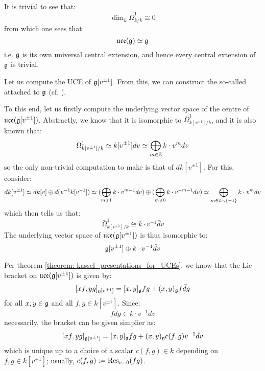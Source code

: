         \begin{example}
           It is trivial to see that:
                $$\dim_k \bar{\Omega}^1_{k/k} \cong 0$$
            from which one sees that:
                $$\mathfrak{uce}(\mathfrak{g}) \simeq \mathfrak{g}$$
            i.e. $\mathfrak{g}$ is its own universal central extension, and hence every central extension of $\mathfrak{g}$ is trivial.
        \end{example}
        \begin{example} \label{example: affine_lie_algebras_centres}
            Let us compute the UCE of $\mathfrak{g}[v^{\pm 1}]$. From this, we can construct the so-called  attached to $\mathfrak{g}$ (cf. \cite[Chapter 7]{kac_infinite_dimensional_lie_algebras}). 

            To this end, let us firstly compute the underlying vector space of the centre of $\mathfrak{uce}(\mathfrak{g}[v^{\pm 1}])$. Abstractly, we know that it is isomorphic to $\bar{\Omega}^1_{k[v^{\pm 1}]/k}$, and it is also known that:
                $$\Omega^1_{k[v^{\pm 1}]/k} \simeq k[v^{\pm 1}] dv \simeq \bigoplus_{m \in \mathbb{Z}} k \cdot v^m dv$$
            so the only non-trivial computation to make is that of $d k[v^{\pm 1}]$. For this, consider:
                $$d k[v^{\pm 1}] \simeq d k[v] \oplus d(v^{-1} k[v^{-1}]) \simeq ( \bigoplus_{m \geqslant 1} k \cdot v^{m - 1} dv ) \oplus ( \bigoplus_{m \geqslant 0} k \cdot v^{-m - 1} dv ) \simeq \bigoplus_{m \in \mathbb{Z} \smallsetminus \{-1\}} k \cdot v^m dv$$
            which then tells us that:
                $$\bar{\Omega}^1_{k[v^{\pm 1}]/k} \cong k \cdot v^{-1} \bar{d}v$$
            The underlying vector space of $\mathfrak{uce}(\mathfrak{g}[v^{\pm 1}])$ is thus isomorphic to:
                $$\mathfrak{g}[v^{\pm 1}] \oplus k \cdot v^{-1} \bar{d}v$$

            Per theorem \ref{theorem: kassel_presentations_for_UCEs}, we know that the Lie bracket on $\mathfrak{uce}(\mathfrak{g}[v^{\pm 1}])$ is given by:
                $$[x f, y g]_{\mathfrak{g}[v^{\pm 1}]} = [x, y]_{\mathfrak{g}} fg + (x, y)_{\mathfrak{g}} f \bar{d}g$$
            for all $x, y \in \mathfrak{g}$ and all $f, g \in k[v^{\pm 1}]$. Since:
                $$f \bar{d}g \in k \cdot v^{-1} \bar{d}v$$
            necessarily, the bracket can be given simplier as:
                $$[x f, y g]_{\mathfrak{g}[v^{\pm 1}]} = [x, y]_{\mathfrak{g}} fg + (x, y)_{\mathfrak{g}} c(f, g) v^{-1} \bar{d}v$$
            which is unique up to a choice of a scalar $c(f, g) \in k$ depending on $f, g \in k[v^{\pm 1}]$; usually, $c(f, g) := \mathrm{Res}_{v = 0}(fg)$.


\end{example}
